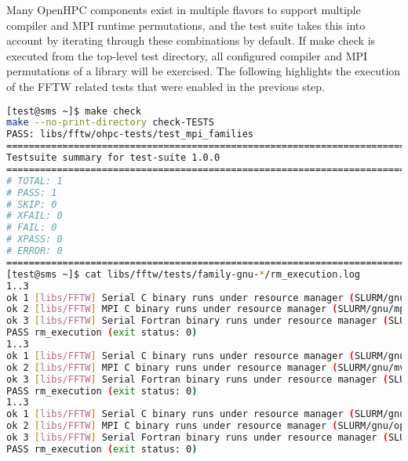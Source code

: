 Many OpenHPC components exist in multiple flavors to support multiple compiler and MPI runtime permutations, and the test suite takes this into account by iterating through these combinations by default.
If make check is executed from the top-level test directory, all configured compiler and MPI permutations of a library will be exercised. The following highlights the execution of the FFTW related tests that were enabled in the previous step.

\begin{lstlisting}[language=bash,keywords={},upquote=true]
[test@sms ~]$ make check 
make --no-print-directory check-TESTS 
PASS: libs/fftw/ohpc-tests/test_mpi_families
============================================================================ 
Testsuite summary for test-suite 1.0.0
============================================================================ 
# TOTAL: 1 
# PASS: 1 
# SKIP: 0 
# XFAIL: 0 
# FAIL: 0 
# XPASS: 0 
# ERROR: 0 
============================================================================ 
[test@sms ~]$ cat libs/fftw/tests/family-gnu-*/rm_execution.log 
1..3 
ok 1 [libs/FFTW] Serial C binary runs under resource manager (SLURM/gnu/mpich) 
ok 2 [libs/FFTW] MPI C binary runs under resource manager (SLURM/gnu/mpich) 
ok 3 [libs/FFTW] Serial Fortran binary runs under resource manager (SLURM/gnu/mpich) 
PASS rm_execution (exit status: 0) 
1..3 
ok 1 [libs/FFTW] Serial C binary runs under resource manager (SLURM/gnu/mvapich2) 
ok 2 [libs/FFTW] MPI C binary runs under resource manager (SLURM/gnu/mvapich2) 
ok 3 [libs/FFTW] Serial Fortran binary runs under resource manager (SLURM/gnu/mvapich2) 
PASS rm_execution (exit status: 0) 
1..3 
ok 1 [libs/FFTW] Serial C binary runs under resource manager (SLURM/gnu/openmpi) 
ok 2 [libs/FFTW] MPI C binary runs under resource manager (SLURM/gnu/openmpi) 
ok 3 [libs/FFTW] Serial Fortran binary runs under resource manager (SLURM/gnu/openmpi) 
PASS rm_execution (exit status: 0)
\end{lstlisting}
